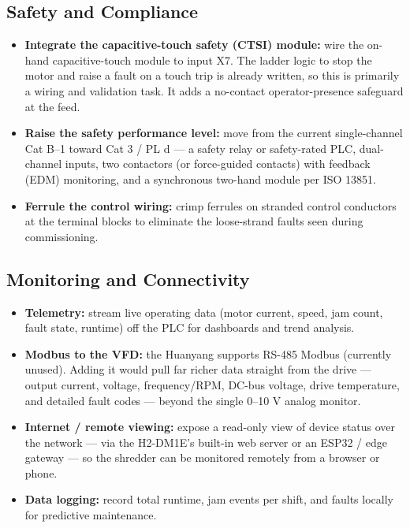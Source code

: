 \documentclass[hidelinks,12pt]{article}
\begin{document}
\subsection{Safety and Compliance}
\begin{itemize}
    \item \textbf{Integrate the capacitive-touch safety (CTSI) module:} wire the on-hand capacitive-touch module to input X7. The ladder logic to stop the motor and raise a fault on a touch trip is already written, so this is primarily a wiring and validation task. It adds a no-contact operator-presence safeguard at the feed.
    \item \textbf{Raise the safety performance level:} move from the current single-channel Cat B--1 toward Cat 3 / PL d --- a safety relay or safety-rated PLC, dual-channel inputs, two contactors (or force-guided contacts) with feedback (EDM) monitoring, and a synchronous two-hand module per ISO 13851.
    \item \textbf{Ferrule the control wiring:} crimp ferrules on stranded control conductors at the terminal blocks to eliminate the loose-strand faults seen during commissioning.
\end{itemize}

\subsection{Monitoring and Connectivity}
\begin{itemize}
    \item \textbf{Telemetry:} stream live operating data (motor current, speed, jam count, fault state, runtime) off the PLC for dashboards and trend analysis.
    \item \textbf{Modbus to the VFD:} the Huanyang supports RS-485 Modbus (currently unused). Adding it would pull far richer data straight from the drive --- output current, voltage, frequency/RPM, DC-bus voltage, drive temperature, and detailed fault codes --- beyond the single 0--10 V analog monitor.
    \item \textbf{Internet / remote viewing:} expose a read-only view of device status over the network --- via the H2-DM1E's built-in web server or an ESP32 / edge gateway --- so the shredder can be monitored remotely from a browser or phone.
    \item \textbf{Data logging:} record total runtime, jam events per shift, and faults locally for predictive maintenance.
\end{itemize}
\end{document}
